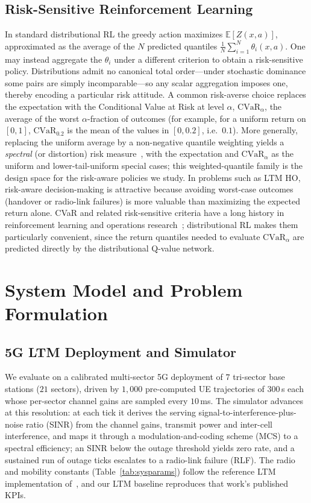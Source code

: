 \documentclass[conference]{IEEEtran}
\begin{document}
\subsection{Risk-Sensitive Reinforcement Learning}
\label{sec:rel-risk}
In standard distributional RL the greedy action maximizes $\mathbb{E}[Z(x,a)]$,
approximated as the average of the $N$ predicted quantiles
$\tfrac{1}{N}\sum_{i=1}^{N}\theta_i(x,a)$.
One may instead aggregate the $\theta_i$ under a different criterion to obtain a
risk-sensitive policy. Distributions admit no canonical total order---under
stochastic dominance some pairs are simply incomparable---so any scalar
aggregation imposes one, thereby encoding a particular risk attitude.
A common risk-averse choice replaces the expectation with the Conditional Value
at Risk at level $\alpha$, $\mathrm{CVaR}_\alpha$, the average of the worst
$\alpha$-fraction of outcomes
(for example, for a uniform return on $[0,1]$, $\mathrm{CVaR}_{0.2}$ is the mean
of the values in $[0,0.2]$, i.e.\ $0.1$).
More generally, replacing the uniform average by a non-negative quantile
weighting yields a \emph{spectral} (or distortion) risk measure~\cite{acerbi},
with the expectation and $\mathrm{CVaR}_\alpha$ as the uniform and
lower-tail-uniform special cases; this weighted-quantile family is the design
space for the risk-aware policies we study.
In problems such as LTM HO, risk-aware decision-making is attractive because
avoiding worst-case outcomes (handover or radio-link failures) is more valuable
than maximizing the expected return alone.
CVaR and related risk-sensitive criteria have a long history in reinforcement
learning and operations research~\cite{rockafellar,chow2014,tamar2015};
distributional RL makes them particularly convenient, since the return quantiles
needed to evaluate $\mathrm{CVaR}_\alpha$ are predicted directly by the
distributional Q-value network.

\section{System Model and Problem Formulation}
\label{sec:model}

\subsection{5G LTM Deployment and Simulator}
We evaluate on a calibrated multi-sector 5G deployment of $7$ tri-sector base
stations ($21$ sectors), driven by $1{,}000$ pre-computed UE trajectories of
$300$\,s each whose per-sector channel gains are sampled every $10$\,ms. The
simulator advances at this resolution: at each tick it derives the serving
signal-to-interference-plus-noise ratio (SINR) from the channel gains, transmit
power and inter-cell interference, and maps it through a modulation-and-coding
scheme (MCS) to a spectral efficiency; an SINR below the outage threshold yields
zero rate, and a sustained run of outage ticks escalates to a radio-link failure
(RLF). The radio and mobility constants (Table~\ref{tab:sysparams}) follow the
reference LTM implementation of~\cite{cmab_ho}, and our LTM baseline reproduces
that work's published KPIs.
\end{document}
